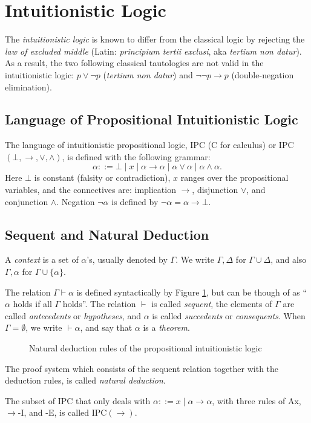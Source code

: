 \section{Intuitionistic Logic}

The \textit{intuitionistic logic} is known to differ from the classical logic by rejecting the \textit{law of excluded middle} (Latin: \textit{principium tertii exclusi}, aka \textit{tertium non datur}). As a result, the two following classical tautologies are not valid in the intuitionistic logic: $p \vee \neg p$ (\textit{tertium non datur}) and $\neg \neg p \rightarrow p$ (double-negation elimination).

\subsection{Language of Propositional Intuitionistic Logic}

The language of intuitionistic propositional logic, IPC (C for calculus) or IPC$(\bot, \rightarrow, \vee, \wedge)$, is defined with the following grammar:
\[
\alpha ::= \bot \mid x \mid \alpha \rightarrow \alpha \mid \alpha \vee \alpha \mid \alpha \wedge \alpha.
\]
Here $\bot$ is constant (falsity or contradiction), $x$ ranges over the propositional variables, and the connectives are: implication $\rightarrow$, disjunction $\vee$, and conjunction $\wedge$. Negation $\neg \alpha$ is defined by $\neg \alpha = \alpha \rightarrow \bot$.

\subsection{Sequent and Natural Deduction}

A \textit{context} is a set of $\alpha$'s, usually denoted by $\Gamma$. We write $\Gamma, \Delta$ for $\Gamma \cup \Delta$, and also $\Gamma, \alpha$ for $\Gamma \cup \{\alpha\}$. 

\begin{definition}[Sequent]
The relation $\Gamma \vdash \alpha$ is defined syntactically by Figure \ref{fig:intuitionistic-logic-natural-deduction}, but can be though of as ``$\alpha$ holds if all $\Gamma$ holds''. The relation $\vdash$ is called \textit{sequent}, the elements of $\Gamma$ are called \textit{antecedents} or \textit{hypotheses}, and $\alpha$ is called \textit{succedents} or \textit{consequents}. When $\Gamma = \emptyset$, we write $\vdash \alpha$, and say that $\alpha$ is a \textit{theorem}.
\end{definition}

\begin{figure}
    \centering
    
    \caption{Natural deduction rules of the propositional intuitionistic logic}
    \label{fig:intuitionistic-logic-natural-deduction}
\end{figure}

The proof system which consists of the sequent relation together with the deduction rules, is called \textit{natural deduction}.

The subset of IPC that only deals with $\alpha ::= x \mid \alpha \rightarrow \alpha$, with three rules of Ax, $\rightarrow$-I, and -E, is called IPC$(\rightarrow)$.